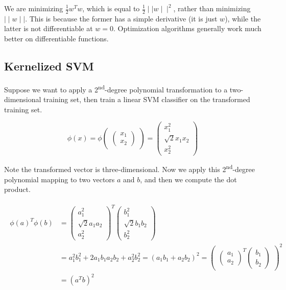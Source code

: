 \documentclass[letterpaper]{article}
\begin{document}
We are minimizing $\frac{1}{2}w^{T}w$, which is equal to $\frac{1}{2} \mid \mid w \mid \mid^{2}$, rather than minimizing $\mid \mid w \mid \mid$. This is because the former has a simple derivative (it is just $w$), while the latter is not differentiable at $w = 0$. Optimization algorithms generally work much better on differentiable functions. 

\subsection{Kernelized SVM}
Suppose we want to apply a 2\textsuperscript{nd}-degree polynomial transformation to a two-dimensional training set, then train a linear SVM classifier on the transformed training set. 

$$\phi(x) = \phi \begin{pmatrix}
\begin{pmatrix}
x_{1} \\
x_{2}
\end{pmatrix}
\end{pmatrix}
= \begin{pmatrix}
x_{1}^{2} \\
\sqrt{2}x_{1}x_{2} \\ 
x_{2}^{2}
\end{pmatrix}
$$

Note the transformed vector is three-dimensional. Now we apply this 2\textsuperscript{nd}-degree polynomial mapping to two vectors $a$ and $b$, and then we compute the dot product. 

\begin{align*}
\begin{split}
\phi(a)^{T}\phi(b) & = \begin{pmatrix}
a_{1}^{2} \\ 
\sqrt{2}a_{1}a_{2} \\ 
a_{2}^{2}
\end{pmatrix} ^{T} \begin{pmatrix}
b_{1}^{2} \\ 
\sqrt{2}b_{1}b_{2} \\ 
b_{2}^{2}
\end{pmatrix} \\ & 
= a_{1}^{2}b_{1}^{2} + 2a_{1}b_{1}a_{2}b_{2} + a_{2}^{2}b_{2}^{2} = (a_{1}b_{1} + a_{2}b_{2})^{2} = \begin{pmatrix}
\begin{pmatrix}
a_{1} \\
a_{2}
\end{pmatrix}^{T}
\begin{pmatrix}
b_{1} \\
b_{2}
\end{pmatrix}
\end{pmatrix}^{2} \\ & 
= (a^{T}b)^{2}
\end{split}
\end{align*}
\end{document}
